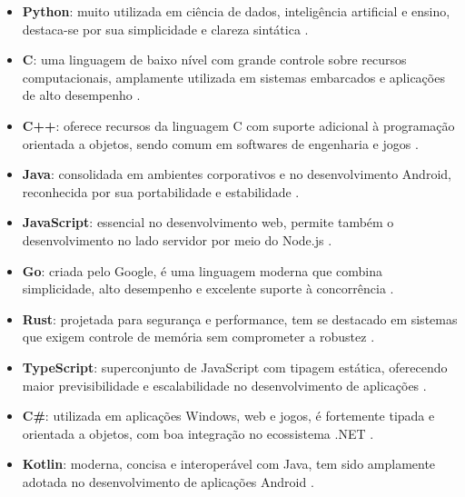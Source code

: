 \documentclass[12pt,oneside,a4paper]{report}
\begin{document}
\begin{itemize}
    \item \textbf{Python}: muito utilizada em ciência de dados, inteligência artificial e ensino, destaca-se por sua simplicidade e clareza sintática \cite{sebesta2016}.
    
    \item \textbf{C}: uma linguagem de baixo nível com grande controle sobre recursos computacionais, amplamente utilizada em sistemas embarcados e aplicações de alto desempenho \cite{scott2015}.
    
    \item \textbf{C++}: oferece recursos da linguagem C com suporte adicional à programação orientada a objetos, sendo comum em softwares de engenharia e jogos \cite{sebesta2016}.
    
    \item \textbf{Java}: consolidada em ambientes corporativos e no desenvolvimento Android, reconhecida por sua portabilidade e estabilidade \cite{sebesta2016}.
    
    \item \textbf{JavaScript}: essencial no desenvolvimento web, permite também o desenvolvimento no lado servidor por meio do Node.js \cite{sebesta2016, scott2015}.
    
    \item \textbf{Go}: criada pelo Google, é uma linguagem moderna que combina simplicidade, alto desempenho e excelente suporte à concorrência \cite{scott2015}.
    
    \item \textbf{Rust}: projetada para segurança e performance, tem se destacado em sistemas que exigem controle de memória sem comprometer a robustez \cite{scott2015}.
    
    \item \textbf{TypeScript}: superconjunto de JavaScript com tipagem estática, oferecendo maior previsibilidade e escalabilidade no desenvolvimento de aplicações \cite{scott2015}.
    
    \item \textbf{C\#}: utilizada em aplicações Windows, web e jogos, é fortemente tipada e orientada a objetos, com boa integração no ecossistema .NET \cite{sebesta2016}.
    
    \item \textbf{Kotlin}: moderna, concisa e interoperável com Java, tem sido amplamente adotada no desenvolvimento de aplicações Android \cite{scott2015}.
\end{itemize}
\end{document}
